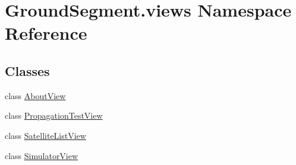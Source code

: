 \hypertarget{namespace_ground_segment_1_1views}{}\section{Ground\+Segment.\+views Namespace Reference}
\label{namespace_ground_segment_1_1views}
\subsection*{Classes}
\begin{DoxyCompactItemize}
\item 
class \hyperlink{class_ground_segment_1_1views_1_1_about_view}{About\+View}
\item 
class \hyperlink{class_ground_segment_1_1views_1_1_propagation_test_view}{Propagation\+Test\+View}
\item 
class \hyperlink{class_ground_segment_1_1views_1_1_satellite_list_view}{Satellite\+List\+View}
\item 
class \hyperlink{class_ground_segment_1_1views_1_1_simulator_view}{Simulator\+View}
\end{DoxyCompactItemize}
